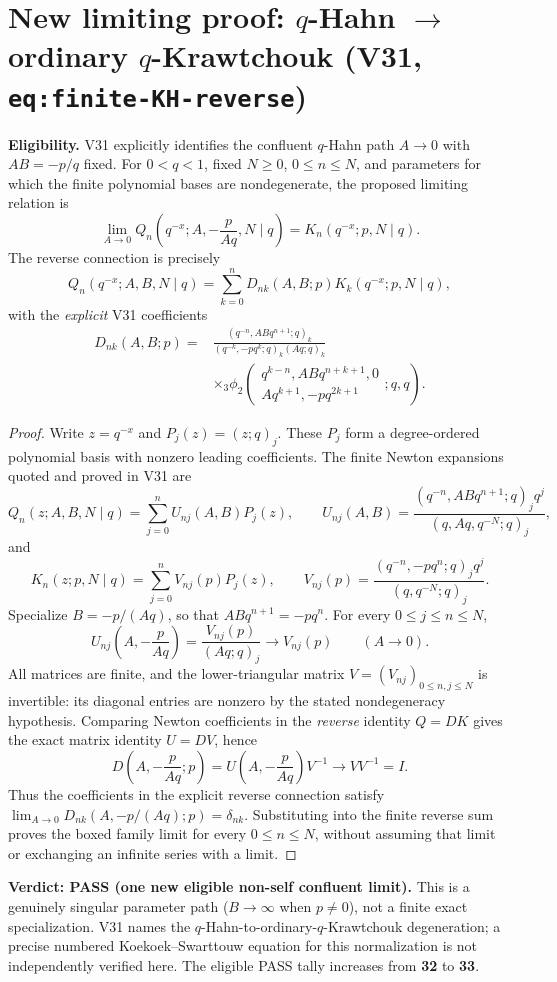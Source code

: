 \documentclass[11pt]{article}
\begin{document}
\section{New limiting proof: $q$-Hahn $\to$ ordinary $q$-Krawtchouk (V31, \texttt{eq:finite-KH-reverse})}
\noindent\textbf{Eligibility.} V31 explicitly identifies the confluent $q$-Hahn path $A\to0$ with $AB=-p/q$ fixed. For $0<q<1$, fixed $N\ge0$, $0\le n\le N$, and parameters for which the finite polynomial bases are nondegenerate, the proposed limiting relation is
\[
\boxed{\lim_{A\to0}Q_n\!\left(q^{-x};A,-\frac{p}{Aq},N\mid q\right)
=K_n(q^{-x};p,N\mid q).}
\]
\noindent The reverse connection is precisely
\[
Q_n(q^{-x};A,B,N\mid q)=\sum_{k=0}^n D_{nk}(A,B;p)K_k(q^{-x};p,N\mid q),
\]
with the \emph{explicit} V31 coefficients
\[
\begin{split}
D_{nk}(A,B;p)={}&
\frac{(q^{-n},ABq^{n+1};q)_k}{(q^{-k},-pq^k;q)_k(Aq;q)_k}\\
&\times{}_3\phi_2\!\left(\begin{matrix}q^{k-n},ABq^{n+k+1},0\\Aq^{k+1},-pq^{2k+1}\end{matrix};q,q\right).
\end{split}
\]
\begin{proof}
Write $z=q^{-x}$ and $P_j(z)=(z;q)_j$. These $P_j$ form a degree-ordered polynomial basis with nonzero leading coefficients. The finite Newton expansions quoted and proved in V31 are
\[
Q_n(z;A,B,N\mid q)=\sum_{j=0}^n U_{nj}(A,B)P_j(z),\qquad
U_{nj}(A,B)=\frac{(q^{-n},ABq^{n+1};q)_j q^j}{(q,Aq,q^{-N};q)_j},
\]
and
\[
K_n(z;p,N\mid q)=\sum_{j=0}^n V_{nj}(p)P_j(z),\qquad
V_{nj}(p)=\frac{(q^{-n},-pq^n;q)_j q^j}{(q,q^{-N};q)_j}.
\]
Specialize $B=-p/(Aq)$, so that $ABq^{n+1}=-pq^n$. For every $0\le j\le n\le N$,
\[
U_{nj}\left(A,-\frac{p}{Aq}\right)
=\frac{V_{nj}(p)}{(Aq;q)_j}\longrightarrow V_{nj}(p)
\qquad(A\to0).
\]
All matrices are finite, and the lower-triangular matrix $V=(V_{nj})_{0\le n,j\le N}$ is invertible: its diagonal entries are nonzero by the stated nondegeneracy hypothesis. Comparing Newton coefficients in the \emph{reverse} identity $Q=DK$ gives the exact matrix identity $U=DV$, hence
\[
D\left(A,-\frac{p}{Aq};p\right)
=U\left(A,-\frac{p}{Aq}\right)V^{-1}\longrightarrow VV^{-1}=I.
\]
Thus the coefficients in the explicit reverse connection satisfy
$\lim_{A\to0}D_{nk}(A,-p/(Aq);p)=\delta_{nk}$.
Substituting into the finite reverse sum proves the boxed family limit for every $0\le n\le N$, without assuming that limit or exchanging an infinite series with a limit.
\end{proof}
\noindent\textbf{Verdict: PASS (one new eligible non-self confluent limit).} This is a genuinely singular parameter path ($B\to\infty$ when $p\ne0$), not a finite exact specialization. V31 names the $q$-Hahn-to-ordinary-$q$-Krawtchouk degeneration; a precise numbered Koekoek--Swarttouw equation for this normalization is not independently verified here. The eligible PASS tally increases from \textbf{32} to \textbf{33}.
\end{document}
